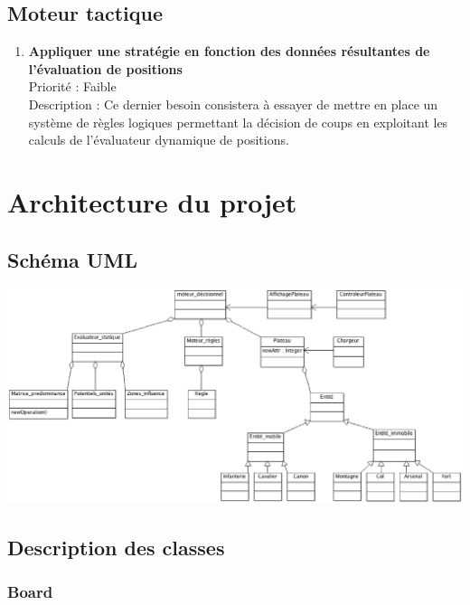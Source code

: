 \documentclass[12pt]{article}
\begin{document}
		\subsection{Moteur tactique}

			\begin{enumerate}

				\item \textbf{Appliquer une stratégie en fonction des données résultantes de l'évaluation de positions} 
				\\[0.7\baselineskip]
				Priorité : Faible 
				\\[0.7\baselineskip]
				Description : Ce dernier besoin consistera à essayer de mettre en place un système de règles logiques permettant la décision de coups en exploitant les 
				calculs de l'évaluateur dynamique de positions. 
				
			\end{enumerate}
		
		\clearpage

	\section{Architecture du projet}    

		\subsection{Schéma UML}

			\includegraphics[scale=0.4]{images/diag_classes.eps}

			\clearpage

		\subsection{Description des classes}

			\subsubsection{Board}
			
\end{document}
